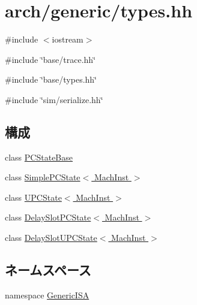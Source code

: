 \hypertarget{arch_2generic_2types_8hh}{
\section{arch/generic/types.hh}
\label{arch_2generic_2types_8hh}
}
{\ttfamily \#include $<$iostream$>$}\par
{\ttfamily \#include \char`\"{}base/trace.hh\char`\"{}}\par
{\ttfamily \#include \char`\"{}base/types.hh\char`\"{}}\par
{\ttfamily \#include \char`\"{}sim/serialize.hh\char`\"{}}\par
\subsection*{構成}
\begin{DoxyCompactItemize}
\item 
class \hyperlink{classGenericISA_1_1PCStateBase}{PCStateBase}
\item 
class \hyperlink{classGenericISA_1_1SimplePCState}{SimplePCState$<$ MachInst $>$}
\item 
class \hyperlink{classGenericISA_1_1UPCState}{UPCState$<$ MachInst $>$}
\item 
class \hyperlink{classGenericISA_1_1DelaySlotPCState}{DelaySlotPCState$<$ MachInst $>$}
\item 
class \hyperlink{classGenericISA_1_1DelaySlotUPCState}{DelaySlotUPCState$<$ MachInst $>$}
\end{DoxyCompactItemize}
\subsection*{ネームスペース}
\begin{DoxyCompactItemize}
\item 
namespace \hyperlink{namespaceGenericISA}{GenericISA}
\end{DoxyCompactItemize}
